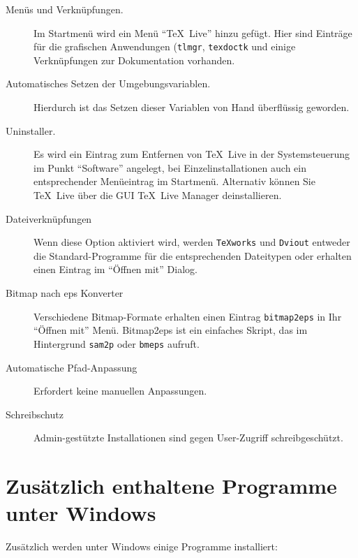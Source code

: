 \documentclass[12pt,ngerman,a4paper,fullparskip]{report}
\newcommand{\TL}{\TeX\ Live\xspace}
\newcommand{\cmdname}[1]{\texttt{#1}}
\newcommand{\prog}[1]{\texttt{#1}}
\begin{document}
\begin{description}
\item[Menüs und Verknüpfungen.] Im Startmenü wird ein Menü \enquote{\TL} hinzu gefügt. Hier sind Einträge für
  die grafischen Anwendungen (\prog{tlmgr}, \prog{texdoctk} 
  und einige Verknüpfungen zur Dokumentation vorhanden. 
\item[Automatisches Setzen der Umgebungsvariablen.] Hierdurch ist das Setzen dieser Variablen
  von Hand überflüssig geworden.
\item[Uninstaller.] Es wird ein Eintrag zum Entfernen von \TL in der Systemsteuerung im Punkt \enquote{Software} angelegt, bei Einzelinstallationen auch ein entsprechender Menüeintrag im Startmenü.
  Alternativ können Sie \TL über die GUI \TeX\ Live Manager deinstallieren.
\item[Dateiverknüpfungen] Wenn diese Option aktiviert wird, werden \prog{TeXworks} und \prog{Dviout}
  entweder die Standard-Programme für die entsprechenden Dateitypen oder erhalten einen Eintrag im \enquote{Öffnen mit} Dialog. \enlargethispage{1.5cm}
\item[Bitmap nach eps Konverter] Verschiedene Bitmap-Formate erhalten einen Eintrag \cmdname{bitmap2eps} in Ihr \enquote{Öffnen mit} Menü. Bitmap2eps ist ein einfaches Skript, das im Hintergrund \cmdname{sam2p} oder \cmdname{bmeps} aufruft. 
\item[Automatische Pfad-Anpassung] Erfordert keine manuellen Anpassungen.
\item[Schreibschutz] Admin-gestützte Installationen sind gegen User-Zugriff schreibgeschützt. 
\end{description}


\section{Zusätzlich enthaltene Programme unter Windows}

Zusätzlich werden unter Windows einige Programme installiert:
\end{document}
